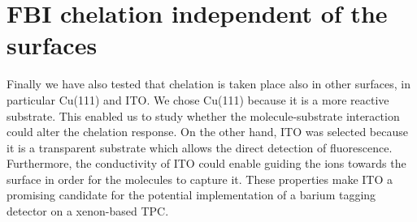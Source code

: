 \documentclass[aps,prl,reprint,longbibliography,superscriptaddress, english]{revtex4-1}
\newcommand{\completar}[1]{{\color{red} #1}}
\begin{document}





\section{FBI chelation independent of the surfaces}

Finally we have also tested that chelation is taken place also in other surfaces, in particular Cu(111) and ITO. We chose Cu(111) because it is a more reactive substrate. This enabled us to study whether the molecule-substrate interaction could alter the chelation response. On the other hand, ITO was selected because it is a transparent substrate which allows the direct detection of fluorescence. Furthermore, the conductivity of ITO could enable guiding the \Bapp ions towards the surface in order for the molecules to capture it. These properties make ITO a promising candidate for the potential implementation of a barium tagging detector on a xenon-based TPC\cite{rivilla_fluorescent_2020}.


\end{document}
